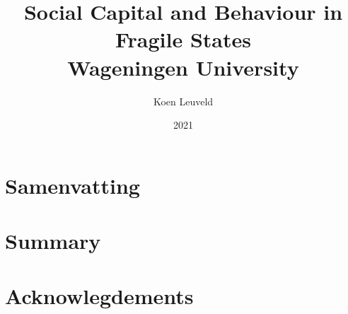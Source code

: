 



\title{
	{Social Capital and Behaviour in Fragile States}\\
	{\large Wageningen University}\\
}
\author{Koen Leuveld}
\date{2021}

\maketitle
\tableofcontents
\todototoc
\listoftodos

% 

%
%
%
%

\clearpage
{}
\chapter*{Samenvatting}


\clearpage
{}
\chapter*{Summary}


\chapter*{Acknowlegdements}








